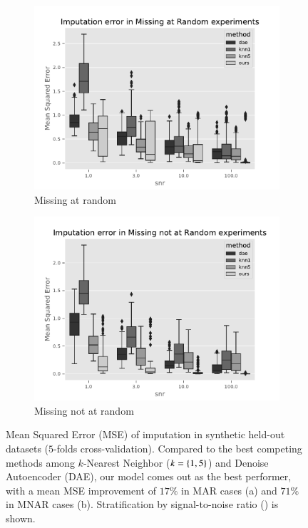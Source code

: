 \begin{figure}[htb]
\centering
\begin{subfigure}{.49\textwidth}
	\centering
        \includegraphics[width=\textwidth]{./tex/fig/mar_imput_err_boxplot.pdf}
        \caption{Missing at random}
        \label{fig:synthetic_benchmark_mar_box}
\end{subfigure}%
\hfill
\begin{subfigure}{.49\textwidth}
	\centering
        \includegraphics[width=\textwidth]{./tex/fig/mnar_imput_err_boxplot.pdf}
        \caption{Missing not at random}
        \label{fig:synthetic_benchmark_mnar_box}
\end{subfigure}
\caption{
Mean Squared Error (MSE) of imputation in synthetic held-out datasets ($5$-folds cross-validation).
Compared to the best competing methods among $k$-Nearest Neighbor ($k=\left\{1, 5\right\}$) and Denoise Autoencoder (DAE), our model comes out as the best performer, with a mean MSE improvement of $17\%$ in MAR cases (a) and $71\%$ in MNAR cases (b).
Stratification by signal-to-noise ratio (\snr) is shown.
}
\label{fig:synthetic_benchmark_box}
\end{figure}

